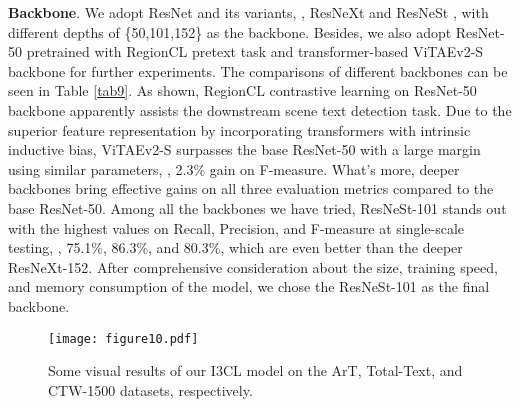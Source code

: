 \textbf{Backbone}. We adopt ResNet \citep{resnet} and its variants, , ResNeXt \citep{resnext} and ResNeSt \citep{resnest}, with different depths of \{50,101,152\} as the backbone. Besides, we also adopt ResNet-50 pretrained with RegionCL \citep{regioncl} pretext task and transformer-based ViTAEv2-S \citep{zhang2022vitaev2} backbone for further experiments. The comparisons of different backbones can be seen in Table \ref{tab9}. As shown, RegionCL contrastive learning on ResNet-50 backbone apparently assists the downstream scene text detection task. Due to the superior feature representation by incorporating transformers with intrinsic inductive bias, ViTAEv2-S surpasses the base ResNet-50 with a large margin using similar parameters, , 2.3\% gain on F-measure. What's more, deeper backbones bring effective gains on all three evaluation metrics compared to the base ResNet-50. Among all the backbones we have tried, ResNeSt-101 stands out with the highest values on Recall, Precision, and F-measure at single-scale testing, , 75.1\%, 86.3\%, and 80.3\%, which are even better than the deeper ResNeXt-152. After comprehensive consideration about the size, training speed, and memory consumption of the model, we chose the ResNeSt-101 as the final backbone.

\begin{figure*}[ht]
  \centering
  \texttt{[image: figure10.pdf]}
  \caption{Some visual results of our I3CL model on the ArT, Total-Text, and CTW-1500 datasets, respectively.}
  \label{fig10}
\end{figure*}



